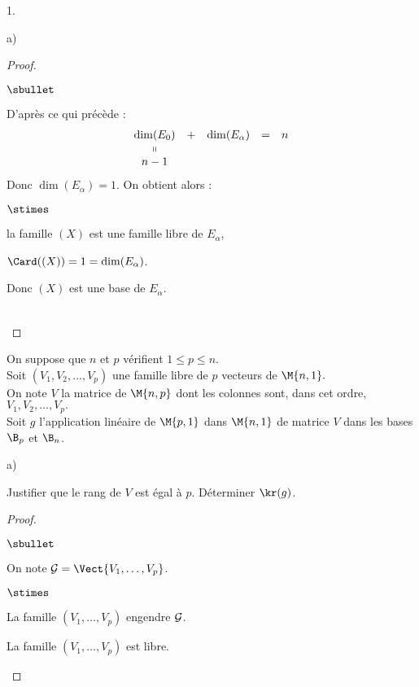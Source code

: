 \documentclass[11pt]{article}%
\begin{document}
\begin{noliste}{1.}
\begin{noliste}{a)}
\begin{proof}
\begin{noliste}{$\sbullet$}
    \item D'après ce qui précède :
    \[
     \begin{array}{ccccc}
      \dim(E_0) & + & \dim(E_\alpha) & = & n
      \\
      \shortparallel 
      \\
      n-1
     \end{array}
    \]
    Donc $\dim(E_\alpha)=1$. On obtient alors :
    \begin{noliste}{$\stimes$}
      \item la famille $(X)$ est une famille libre de $E_\alpha$,
      \item $\Card((X))=1=\dim(E_\alpha)$.
    \end{noliste}
    Donc $(X)$ est une base de $E_\alpha$.
   \end{noliste}
   
   ~\\[-1.4cm]
  \end{proof}
 \end{noliste}
 
 
 
 
 
 
 
 
 \item On suppose que $n$ et $p$ vérifient $1 \leq p \leq n$.\\
 Soit $(V_1,V_2,...,V_p)$ une famille libre de $p$ vecteurs de 
 $\M{n,1}.$\\
 On note $V$ la matrice de $\M{n,p}$ dont les colonnes sont, dans cet 
 ordre, $V_1,V_2,...,V_p.$\\
 Soit $g$ l'application linéaire de $\M{p,1}$ dans $\M{n,1}$ de matrice 
 $V$ dans les bases $\B_p$ et $\B_n$.
 \begin{noliste}{a)}
  \setlength{\itemsep}{2mm}
  \item Justifier que le rang de $V$ est égal à $p$. Déterminer 
  $\kr(g)$.
  
  \begin{proof}~
   \begin{noliste}{$\sbullet$}
    \item On note ${\cal G} = \Vect{V_1, \ldots, V_p}$.
    \begin{noliste}{$\stimes$}
      \item La famille $(V_1, \ldots, V_p)$ engendre ${\cal G}$.
      \item La famille $(V_1, \ldots, V_p)$ est libre.
    \end{noliste} 
    

\end{noliste}
\end{proof}
\end{noliste}
\end{noliste}
\end{document}
